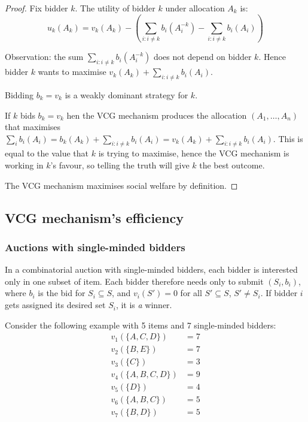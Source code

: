 				\begin{proof}
					Fix bidder $k$. The utility of bidder $k$ under allocation
					$A_k$ is:
					\begin{equation*}
						u_k(A_k) = v_k(A_k) - \left( \sum_{i: i \neq k}
						b_i(A_i^{-k}) - \sum_{i: i \neq k} b_i(A_i) \right)
					\end{equation*}

					Observation: the sum $\sum_{i: i \neq k} b_i(A_i^{-k})$
					does not depend on bidder $k$. Hence bidder $k$ wants to
					maximise $v_k(A_k) + \sum_{i: i \neq k} b_i(A_i)$.

					\begin{claim}
						Bidding $b_k = v_k$ is a weakly dominant strategy for
						$k$.
					\end{claim}
					\begin{subproof}
						If $k$ bids $b_k = v_k$ hen the VCG mechanism produces
						the allocation $(A_1, \ldots, A_n)$ that maximises
						$\sum_i b_i(A_i) = b_k(A_k) + \sum_{i: i \neq k}
						b_i(A_i) = v_k(A_k) + \sum_{i: i \neq k} b_i(A_i)$.
						This is equal to the value that $k$ is trying to
						maximise, hence the VCG mechanism is working in $k$'s
						favour, so telling the truth will give $k$ the best
						outcome.
					\end{subproof}

					The VCG mechanism maximises social welfare by definition.
				\end{proof}

		\subsection{VCG mechanism's efficiency}
			\subsubsection{Auctions with single-minded bidders}
				In a combinatorial auction with single-minded bidders, each
				bidder is interested only in one subset of item. Each bidder
				therefore needs only to submit $(S_i, b_i)$, where $b_i$ is the
				bid for $S_i \subseteq S$, and $v_i(S') = 0$ for all $S'
				\subseteq S$, $S' \neq S_i$. If bidder $i$ gets assigned its
				desired set $S_i$, it is \emph{a} winner.

				Consider the following example with 5 items and 7 single-minded
				bidders:
				\begin{equation*}
					\begin{split}
						v_1(\{A,C,D\})   & = 7 \\
						v_2(\{B,E\})     & = 7 \\
						v_3(\{C\})       & = 3 \\
						v_4(\{A,B,C,D\}) & = 9 \\
						v_5(\{D\})       & = 4 \\
						v_6(\{A,B,C\})   & = 5 \\
						v_7(\{B,D\})     & = 5 \\
					\end{split}
				\end{equation*}

